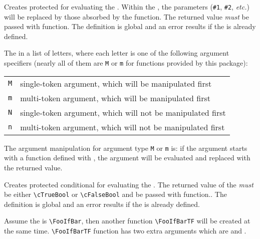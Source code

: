\documentclass[oneside]{book}
\begin{document}
\begin{function}{\PrgNewFunction}
\begin{syntax}
   
\end{syntax}
Creates protected  for evaluating the .
Within the , the parameters (\verb|#1|, \verb|#2|,
\emph{etc.}) will be replaced by those absorbed by the function.
The returned value \emph{must} be passed with  function.
The definition is global and an error results if the
 is already defined.\par
The  in a list of letters,
where each letter is one of the following argument specifiers
(nearly all of them are \texttt{M} or \texttt{m} for functions provided by this package):\par
{\centering\begin{tabular}{ll}
  \texttt{M} & single-token argument, which will be manipulated first \\
  \texttt{m} & multi-token argument, which will be manipulated first \\
  \texttt{N} & single-token argument, which will not be manipulated first \\
  \texttt{n} & multi-token argument, which will not be manipulated first \\
\end{tabular}\par}
The argument manipulation for argument type \texttt{M} or \texttt{m}
is: if the argument starts with a function defined with ,
the argument will be evaluated and replaced with the returned value.
\end{function}

\begin{function}{\PrgNewConditional}
\begin{syntax}
   
\end{syntax}
Creates protected conditional  for evaluating the .
The returned value of the  \emph{must} be either \verb!\cTrueBool!
or \verb!\cFalseBool! and be passed with  function..
The definition is global and an error results if the  is already defined.
\par
Assume the  is \verb!\FooIfBar!, then another function \verb!\FooIfBarTF!
will be created at the same time. \verb!\FooIfBarTF! function has two extra arguments
which are  and .\par
\end{function}
\end{document}
